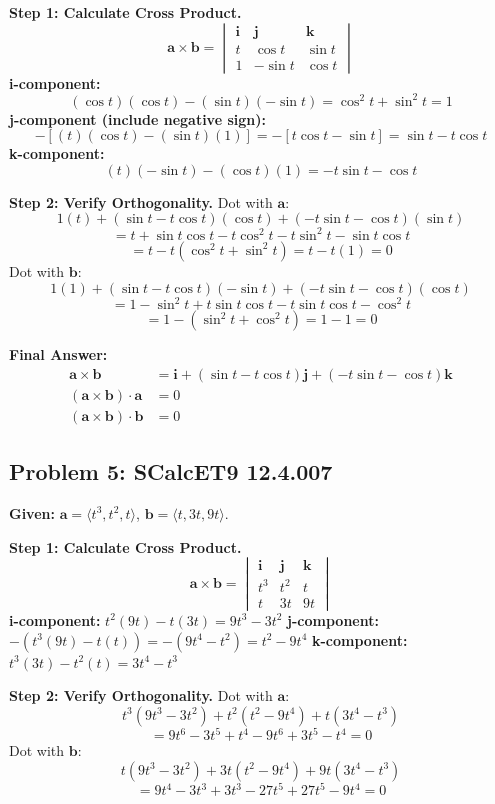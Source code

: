 \documentclass[11pt]{article}
\renewcommand{\vec}[1]{\mathbf{#1}}
\newcommand{\ihat}{\mathbf{i}}
\newcommand{\jhat}{\mathbf{j}}
\newcommand{\khat}{\mathbf{k}}
\begin{document}
\textbf{Step 1: Calculate Cross Product.}
\[
\vec{a} \times \vec{b} = \begin{vmatrix} \ihat & \jhat & \khat \\ t & \cos t & \sin t \\ 1 & -\sin t & \cos t \end{vmatrix}
\]
\textbf{i-component:}
\[
(\cos t)(\cos t) - (\sin t)(-\sin t) = \cos^2 t + \sin^2 t = 1
\]
\textbf{j-component (include negative sign):}
\[
-[ (t)(\cos t) - (\sin t)(1) ] = -[ t\cos t - \sin t ] = \sin t - t\cos t
\]
\textbf{k-component:}
\[
(t)(-\sin t) - (\cos t)(1) = -t\sin t - \cos t
\]

\textbf{Step 2: Verify Orthogonality.}
Dot with $\vec{a}$:
\[
1(t) + (\sin t - t\cos t)(\cos t) + (-t\sin t - \cos t)(\sin t)
\]
\[
= t + \sin t \cos t - t \cos^2 t - t \sin^2 t - \sin t \cos t
\]
\[
= t - t(\cos^2 t + \sin^2 t) = t - t(1) = 0
\]
Dot with $\vec{b}$:
\[
1(1) + (\sin t - t\cos t)(-\sin t) + (-t\sin t - \cos t)(\cos t)
\]
\[
= 1 - \sin^2 t + t \sin t \cos t - t \sin t \cos t - \cos^2 t
\]
\[
= 1 - (\sin^2 t + \cos^2 t) = 1 - 1 = 0
\]

\textbf{Final Answer:}
\begin{align*}
\vec{a} \times \vec{b} &= \ihat + (\sin t - t\cos t)\jhat + (-t\sin t - \cos t)\khat \\
(\vec{a} \times \vec{b}) \cdot \vec{a} &= 0 \\
(\vec{a} \times \vec{b}) \cdot \vec{b} &= 0
\end{align*}

\hrulefill

\subsection*{Problem 5: SCalcET9 12.4.007}
\textbf{Given:} $\vec{a} = \langle t^3, t^2, t \rangle$, $\vec{b} = \langle t, 3t, 9t \rangle$.

\textbf{Step 1: Calculate Cross Product.}
\[
\vec{a} \times \vec{b} = \begin{vmatrix} \ihat & \jhat & \khat \\ t^3 & t^2 & t \\ t & 3t & 9t \end{vmatrix}
\]
\textbf{i-component:} $t^2(9t) - t(3t) = 9t^3 - 3t^2$
\textbf{j-component:} $-(t^3(9t) - t(t)) = -(9t^4 - t^2) = t^2 - 9t^4$
\textbf{k-component:} $t^3(3t) - t^2(t) = 3t^4 - t^3$

\textbf{Step 2: Verify Orthogonality.}
Dot with $\vec{a}$:
\[
t^3(9t^3 - 3t^2) + t^2(t^2 - 9t^4) + t(3t^4 - t^3)
\]
\[
= 9t^6 - 3t^5 + t^4 - 9t^6 + 3t^5 - t^4 = 0
\]
Dot with $\vec{b}$:
\[
t(9t^3 - 3t^2) + 3t(t^2 - 9t^4) + 9t(3t^4 - t^3)
\]
\[
= 9t^4 - 3t^3 + 3t^3 - 27t^5 + 27t^5 - 9t^4 = 0
\]
\end{document}
